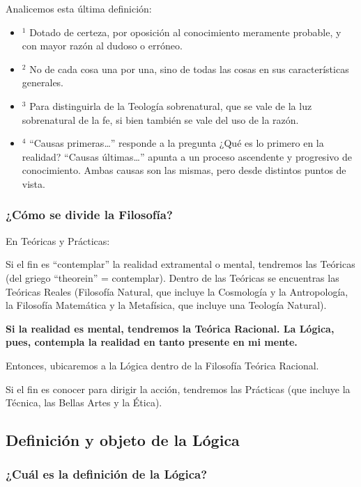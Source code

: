 \documentclass{article}
\begin{document}
    Analicemos esta última definición:
\begin{itemize}[noitemsep,nolistsep]
    \item[] $^1$ Dotado de certeza, por oposición al conocimiento meramente probable, y con mayor razón al dudoso o erróneo.
    \item[] $^2$ No de cada cosa una por una, sino de todas las cosas en sus características generales.
    \item[] $^3$ Para distinguirla de la Teología sobrenatural, que se vale de la luz sobrenatural de la fe, si bien también se vale del uso de la razón.
    \item[] $^4$ ``Causas primeras\ldots'' responde a la pregunta ¿Qué es lo primero en la realidad? ``Causas últimas\ldots'' apunta a un proceso ascendente y progresivo de conocimiento. Ambas causas son las mismas, pero desde distintos puntos de vista.
\end{itemize}

\subsubsection{¿Cómo se divide la Filosofía?}
    En Teóricas y Prácticas: \par
    Si el fin es ``contemplar'' la realidad extramental o mental, tendremos las Teóricas (del griego ``theorein'' = contemplar). Dentro de las Teóricas se encuentras las Teóricas Reales (Filosofía Natural, que incluye la Cosmología y la Antropología, la Filosofía Matemática y la Metafísica, que incluye una Teología Natural). \par
    \textbf{Si la realidad es mental, tendremos la Teórica Racional. La Lógica, pues, contempla la realidad en tanto presente en mi mente.} \par
    Entonces, ubicaremos a la Lógica dentro de la Filosofía Teórica Racional. \par
    Si el fin es conocer para dirigir la acción, tendremos las Prácticas (que incluye la Técnica, las Bellas Artes y la Ética).
 
\subsection{Definición y objeto de la Lógica}

\subsubsection{¿Cuál es la definición de la Lógica?} 
\end{document}
